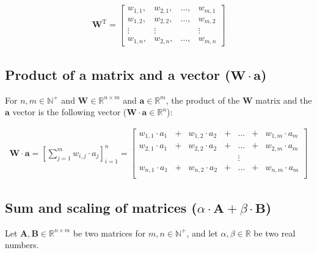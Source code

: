 \documentclass{article}
\begin{document}
        \begin{align*}
          \mathbf{W}^\mathrm{T}
            = \begin{bmatrix}
                w_{1,1}, & w_{2,1}, & \ldots, & w_{m,1} \\
                w_{1,2}, & w_{2,2}, & \ldots, & w_{m,2} \\
                \vdots & \vdots & & \vdots \\
                w_{1,n}, & w_{2,n}, & \ldots, & w_{m,n}
              \end{bmatrix}
        \end{align*}

      \subsection{%
        Product of a matrix and a vector ($\mathbf{W} \cdot \mathbf{a}$)
      }

        For $n, m \in \mathbb{N}^+$ and
        $\mathbf{W} \in \mathbb{R}^{n \times m}$ and
        $\mathbf{a} \in \mathbb{R}^m$, the product of the $\mathbf{W}$ matrix
        and the $\mathbf{a}$ vector is the following vector
        ($\mathbf{W} \cdot \mathbf{a} \in \mathbb{R}^n$):

        \begin{align*}
          \mathbf{W} \cdot \mathbf{a}
            = \left[ \sum_{j=1}^m w_{i,j} \cdot a_j \right]_{i=1}^n
            = \begin{bmatrix}
                w_{1,1} \cdot a_1 & + & w_{1,2} \cdot a_2
                  & + & \ldots & + & w_{1,m} \cdot a_m  \\
                w_{2,1} \cdot a_1 & + & w_{2,2} \cdot a_2
                  & + & \ldots & + & w_{2,m} \cdot a_m  \\
                & & & & \vdots & & \\
                w_{n,1} \cdot a_1 & + & w_{n,2} \cdot a_2
                  & + & \ldots & + & w_{n,m} \cdot a_m  \\
              \end{bmatrix}
        \end{align*}

      \subsection{%
        Sum and scaling of matrices
        ($\alpha \cdot \mathbf{A} + \beta \cdot \mathbf{B}$)
      }

        Let $\mathbf{A}, \mathbf{B} \in \mathbb{R}^{n \times m}$ be two matrices
        for $m, n \in \mathbb{N}^+$, and let $\alpha, \beta \in \mathbb{R}$ be
        two real numbers.
\end{document}

